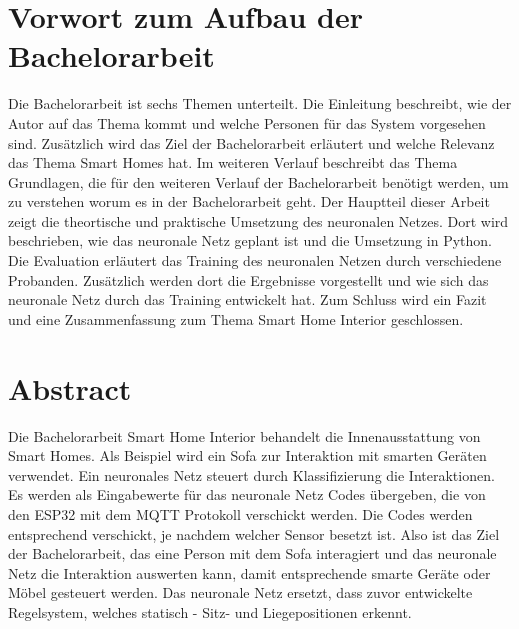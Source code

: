 \chapter*{Vorwort zum Aufbau der Bachelorarbeit}
Die Bachelorarbeit ist sechs Themen unterteilt. Die Einleitung beschreibt, wie der Autor auf das Thema kommt und welche Personen für das System vorgesehen sind. Zusätzlich wird das Ziel der Bachelorarbeit erläutert und welche Relevanz das Thema Smart Homes hat.
\newline
\newline
Im weiteren Verlauf beschreibt das Thema Grundlagen, die für den weiteren Verlauf der Bachelorarbeit benötigt werden, um zu verstehen worum es in der Bachelorarbeit geht.
Der Hauptteil dieser Arbeit zeigt die theortische und praktische Umsetzung des neuronalen Netzes. Dort wird beschrieben, wie das neuronale Netz geplant ist und die Umsetzung in Python. Die Evaluation erläutert das Training des neuronalen Netzen durch verschiedene Probanden. Zusätzlich werden dort die Ergebnisse vorgestellt und wie sich das neuronale Netz durch das Training entwickelt hat. 
\newline
\newline
Zum Schluss wird ein Fazit und eine Zusammenfassung zum Thema Smart Home Interior geschlossen.

\newpage
\chapter*{Abstract}
Die Bachelorarbeit Smart Home Interior behandelt die Innenausstattung von Smart Homes. Als Beispiel wird ein Sofa zur Interaktion mit smarten Geräten verwendet. Ein neuronales Netz steuert durch Klassifizierung die Interaktionen. Es werden als Eingabewerte für das neuronale Netz Codes übergeben, die von den ESP32 mit dem MQTT Protokoll verschickt werden. Die Codes werden entsprechend verschickt, je nachdem welcher Sensor besetzt ist. Also ist das Ziel der Bachelorarbeit, das eine Person mit dem Sofa interagiert und das neuronale Netz die Interaktion auswerten kann, damit entsprechende smarte Geräte oder Möbel gesteuert werden. Das neuronale Netz ersetzt, dass zuvor entwickelte Regelsystem, welches statisch - Sitz- und Liegepositionen erkennt.

